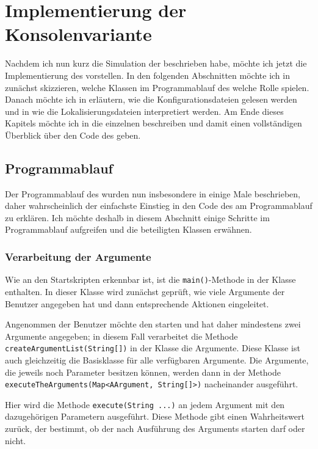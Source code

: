 \chapter{Implementierung der Konsolenvariante}
Nachdem ich nun kurz die Simulation der \mic beschrieben habe, möchte ich jetzt die Implementierung des \md vorstellen. In den folgenden Abschnitten möchte ich in  zunächst skizzieren, welche Klassen im Programmablauf des \md welche Rolle spielen. Danach möchte ich in  erläutern, wie die Konfigurationsdateien gelesen werden und in  wie die Lokalisierungsdateien interpretiert werden. Am Ende dieses Kapitels möchte ich in  die einzelnen \packages beschreiben und damit einen vollständigen Überblick über den Code des \md geben.

\section{Programmablauf}
Der Programmablauf des \md wurden nun insbesondere in  einige Male beschrieben, daher wahrscheinlich der einfachste Einstieg in den Code des \md am Programmablauf zu erklären. Ich möchte deshalb in diesem Abschnitt einige Schritte im Programmablauf aufgreifen und die beteiligten Klassen erwähnen.

\subsection{Verarbeitung der Argumente}
Wie an den Startskripten erkennbar ist, ist die \texttt{main()}-Methode in der Klasse  enthalten. In dieser Klasse wird zunächst geprüft, wie viele Argumente der Benutzer angegeben hat und dann entsprechende Aktionen eingeleitet.

Angenommen der Benutzer möchte den \md starten und hat daher mindestens zwei Argumente angegeben; in diesem Fall verarbeitet die Methode \texttt{createArgumentList(String[])} in der Klasse  die Argumente. Diese Klasse ist auch gleichzeitig die Basisklasse für alle verfügbaren Argumente. Die Argumente, die jeweils noch Parameter besitzen können, werden dann in der Methode \texttt{executeTheArguments(Map<AArgument, String[]>)} nacheinander ausgeführt.

Hier wird die Methode \texttt{execute(String ...)} an jedem Argument mit den dazugehörigen Parametern ausgeführt. Diese Methode gibt einen Wahrheitswert zurück, der bestimmt, ob der \md nach Ausführung des Arguments starten darf oder nicht.

